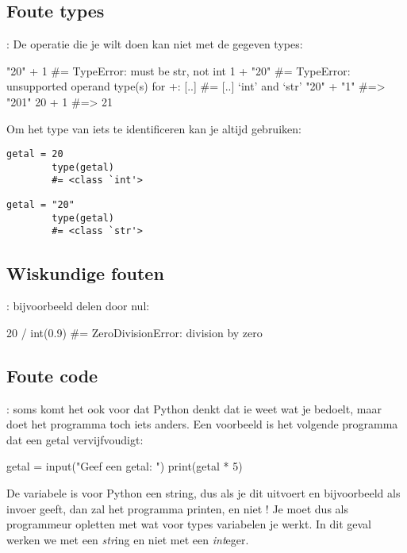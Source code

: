   \subsection{Foute types}: De operatie die je wilt doen kan niet met de gegeven
  types:
  \begin{python}
    "20" + 1
    #= TypeError: must be str, not int
    1 + "20"
    #= TypeError: unsupported operand type(s) for +: [..]
    #=            [..] `int' and `str'
    "20" + "1" #=> "201"
    20 + 1     #=> 21
  \end{python}
  Om het type van iets te identificeren kan je altijd  gebruiken:
  \vspace{-0.5em}
  \begin{center}
    \begin{minipage}{0.46\linewidth}
      \begin{Verbatim}[gobble=8]
        getal = 20
        type(getal)
        #= <class `int'>
        \end{Verbatim}
    \end{minipage} %
    \begin{minipage}{0.46\linewidth}
      \begin{Verbatim}[gobble=8]
        getal = "20"
        type(getal)
        #= <class `str'>
      \end{Verbatim}
    \end{minipage}
  \end{center}

  \subsection{Wiskundige fouten}: bijvoorbeeld delen door nul:
  \begin{python}
    20 / int(0.9)
    #= ZeroDivisionError: division by zero
  \end{python}

  \subsection{Foute code}: soms komt het ook voor dat Python denkt dat ie weet wat
  je bedoelt, maar doet het programma toch iets anders. Een voorbeeld is het
  volgende programma dat een getal vervijfvoudigt:
  \begin{python}
    getal = input("Geef een getal: ")
    print(getal * 5)
  \end{python}
  De variabele  is voor Python een string, dus als je dit uitvoert
  en bijvoorbeeld  als invoer geeft, dan zal het programma
   printen, en niet ! Je moet dus als programmeur
  opletten met wat voor types variabelen je werkt. In dit geval werken we met
  een \emph{str}ing en niet met een \emph{int}eger.

